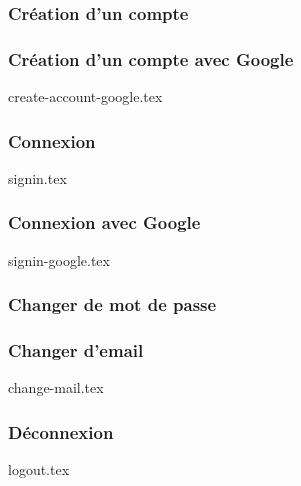\subsubsection{Création d'un compte}

\subsubsection{Création d'un compte avec Google}
{create-account-google.tex}

\subsubsection{Connexion}
{signin.tex}

\subsubsection{Connexion avec Google}
{signin-google.tex}

\subsubsection{Changer de mot de passe}

\subsubsection{Changer d'email}
{change-mail.tex}

\subsubsection{Déconnexion}
{logout.tex}